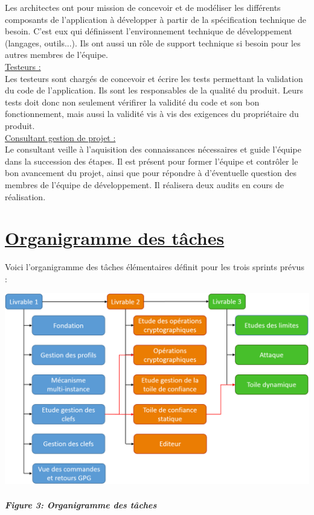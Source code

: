 \documentclass{../res/univ-projet}
\begin{document}
Les architectes ont pour mission de concevoir et de modéliser les différents composants de l'application à développer à partir de la spécification technique de besoin. 
C'est eux qui définissent l'environnement technique de développement (langages, outils...). Ils ont aussi un rôle de support technique si besoin pour les autres 
membres de l'équipe. \\

\underline{Testeurs :} \\

Les testeurs sont chargés de concevoir et écrire les tests permettant la validation du code de l'application. Ils sont les responsables de la qualité du produit. Leurs 
tests doit donc non seulement vérifirer la validité du code et son bon fonctionnement, mais aussi la validité vis à vis des exigences du propriétaire du produit. \\
\newpage
\underline{Consultant gestion de projet :} \\

Le consultant veille à l'aquisition des connaissances nécessaires et guide l'équipe dans la succession des étapes. Il est présent pour former l'équipe et contrôler le bon 
avancement du projet, ainsi que pour répondre à d'éventuelle question des membres de l'équipe de développement. Il réalisera deux audits en cours de réalisation. \\

\section{\underline{Organigramme des tâches}}

Voici l'organigramme des tâches élémentaires définit pour les trois sprints prévus :

\begin{center}
 \includegraphics[scale=0.45]{./graphics/Organigramme_des_taches} \\~\\
 \textbf{\textit{Figure 3: Organigramme des tâches}}
\end{center}
\end{document}
